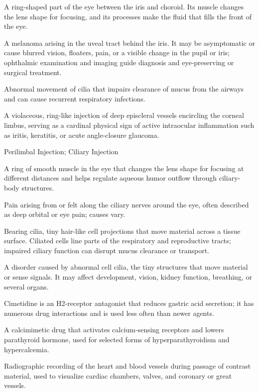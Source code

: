  A ring-shaped part of the eye between the iris and choroid. Its muscle changes the lens shape for focusing, and its processes make the fluid that fills the front of the eye.

 A melanoma arising in the uveal tract behind the iris. It may be asymptomatic or cause blurred vision, floaters, pain, or a visible change in the pupil or iris; ophthalmic examination and imaging guide diagnosis and eye-preserving or surgical treatment.

 Abnormal movement of cilia that impairs clearance of mucus from the airways and can cause recurrent respiratory infections.

 A violaceous, ring-like injection of deep episcleral vessels encircling the corneal limbus, serving as a cardinal physical sign of active intraocular inflammation such as iritis, keratitis, or acute angle-closure glaucoma.

\synonyms
Perilimbal Injection; Ciliary Injection

 A ring of smooth muscle in the eye that changes the lens shape for focusing at different distances and helps regulate aqueous humor outflow through ciliary-body structures.

 Pain arising from or felt along the ciliary nerves around the eye, often described as deep orbital or eye pain; causes vary.

 Bearing cilia, tiny hair-like cell projections that move material across a tissue surface. Ciliated cells line parts of the respiratory and reproductive tracts; impaired ciliary function can disrupt mucus clearance or transport.

 A disorder caused by abnormal cell cilia, the tiny structures that move material or sense signals. It may affect development, vision, kidney function, breathing, or several organs.

 Cimetidine is an H2-receptor antagonist that reduces gastric acid secretion; it has numerous drug interactions and is used less often than newer agents.

 A calcimimetic drug that activates calcium-sensing receptors and lowers parathyroid hormone, used for selected forms of hyperparathyroidism and hypercalcemia.

 Radiographic recording of the heart and blood vessels during passage of contrast
material, used to visualize cardiac chambers, valves, and coronary or great vessels.

